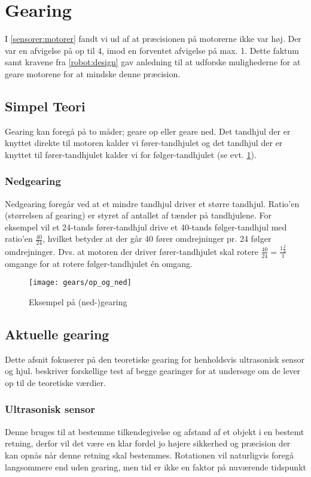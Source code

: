 \section{Gearing}\label{robot:gearing}
I \cref{sensorer:motorer} fandt vi ud af at præcisionen på motorerne ikke var høj.
Der var en afvigelse på op til 4\dg, imod en forventet afvigelse på max. 1\dg.
Dette faktum samt kravene fra \cref{robot:design} gav anledning til at udforske mulighederne for at geare motorene for at mindske denne præcision.

\subsection{Simpel Teori}\label{gearing:simpel_teori}
Gearing kan foregå på to måder; geare op eller geare ned.
Det tandhjul der er knyttet direkte til motoren kalder vi fører-tandhjulet og det tandhjul der er knyttet til fører-tandhjulet kalder vi for følger-tandhjulet (se evt. \cref{gearing:nedgearing}).

\subsubsection{Nedgearing}
Nedgearing foregår ved at et mindre tandhjul driver et større tandhjul.
Ratio'en (størrelsen af gearing) er styret af antallet af tænder på tandhjulene.
For eksempel vil et 24-tands fører-tandhjul drive et 40-tands følger-tandhjul med ratio'en $\frac{40}{24}$, hvilket betyder at der går 40 fører omdrejninger pr. 24 følger omdrejninger. Dvs. at motoren der driver fører-tandhjulet skal rotere $\frac{40}{24} = \frac{1 \frac{2}{3}}{1}$ omgange for at rotere følger-tandhjulet én omgang.

\begin{figure}[h]
\centering
\texttt{[image: gears/op\_og\_ned]}
\caption{Eksempel på (ned-)gearing}
\label{gearing:nedgearing}
\end{figure}

\subsection{Aktuelle gearing}
Dette afsnit fokuserer på den teoretiske gearing for henholdsvis ultrasonisk sensor og hjul.
 beskriver forskellige test af begge gearinger for at undersøge om de lever op til de teoretiske værdier.


\subsubsection{Ultrasonisk sensor}
Denne bruges til at bestemme tilkendegivelse og afstand af et objekt i en bestemt retning, derfor vil det være en klar fordel jo højere sikkerhed og præcision der kan opnås når denne retning skal bestemmes.
Rotationen vil naturligvis foregå langsommere end uden gearing, men tid er ikke en faktor på nuværende tidspunkt


